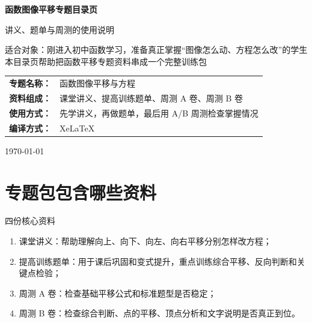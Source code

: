 \documentclass[11pt,a4paper,fontset=fandol]{ctexart}
\begin{document}
\thispagestyle{empty}
\begin{titlepage}
\centering
\vspace*{0.9cm}

\begin{tcolorbox}[
  enhanced,
  width=0.92\textwidth,
  colback=white,
  colframe=mainblue,
  boxrule=1pt,
  arc=0mm,
  left=6mm,
  right=6mm,
  top=8mm,
  bottom=8mm
]
\centering

{\fontsize{24}{30}\selectfont\bfseries 函数图像平移专题目录页\par}
\vspace{0.65cm}
{\fontsize{17}{22}\selectfont 讲义、题单与周测的使用说明\par}

\vspace{1cm}
\begin{tcolorbox}[colback=lightblue,colframe=mainblue,width=0.84\textwidth,boxrule=1pt]
\centering
{\large 适合对象：刚进入初中函数学习，准备真正掌握“图像怎么动、方程怎么改”的学生}\\[0.35em]
{\normalsize 本目录页帮助把函数平移专题资料串成一个完整训练包}
\end{tcolorbox}

\vspace{1.0cm}
\renewcommand{\arraystretch}{1.42}
\begin{tabular}{>{\bfseries}p{3.5cm}p{8cm}}
专题名称： & 函数图像平移与方程 \\
资料组成： & 课堂讲义、提高训练题单、周测 A 卷、周测 B 卷 \\
使用方式： & 先学讲义，再做题单，最后用 A/B 周测检查掌握情况 \\
编译方式： & XeLaTeX \\
\end{tabular}

\vspace{0.9cm}
{\large \today\par}
\end{tcolorbox}
\end{titlepage}

\tableofcontents
\newpage

\section{专题包包含哪些资料}

\begin{goalbox}{四份核心资料}
\begin{enumerate}
  \item 课堂讲义：帮助理解向上、向下、向左、向右平移分别怎样改方程；
  \item 提高训练题单：用于课后巩固和变式提升，重点训练综合平移、反向判断和关键点检验；
  \item 周测 A 卷：检查基础平移公式和标准题型是否稳定；
  \item 周测 B 卷：检查综合判断、点的平移、顶点分析和文字说明是否真正到位。
\end{enumerate}
\end{goalbox}
\end{document}
